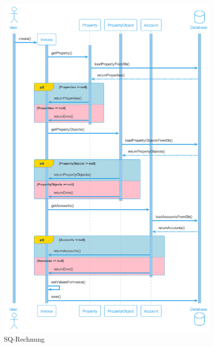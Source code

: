 \begin{figure}[H]
  \begin{center}
    \includegraphics[height=1\textheight]{content/diagrams/out/sequenzdiagram/rechnung/Rechnung.png}
    \caption{SQ-Rechnung}
  \end{center}
\end{figure}